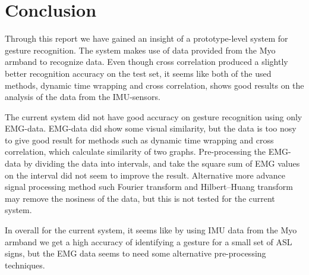 \chapter{Conclusion}
\label{chap:conclusion}
Through this report we have gained an insight of a prototype-level system for gesture recognition. The system makes use of data provided from the Myo armband to recognize data. Even though cross correlation produced a slightly better recognition accuracy on the test set, it seems like both of the used methods, dynamic time wrapping and cross correlation, shows good results on the analysis of the data from the IMU-sensors. 

The current system did not have good accuracy on gesture recognition using only EMG-data. EMG-data did show some visual similarity, but the data is too nosy to give good result for methods such as dynamic time wrapping and cross correlation, which calculate similarity of two graphs. Pre-processing the EMG-data by dividing the data into intervals, and take the square sum of EMG values on the interval did not seem to improve the result. Alternative more advance signal processing method such Fourier transform and Hilbert–Huang transform may remove the nosiness of the data, but this is not tested for the current system.

In overall for the current system, it seems like by using IMU data from the Myo armband we get a high accuracy of identifying a gesture for a small set of ASL signs, but the EMG data seems to need some alternative pre-processing techniques. 